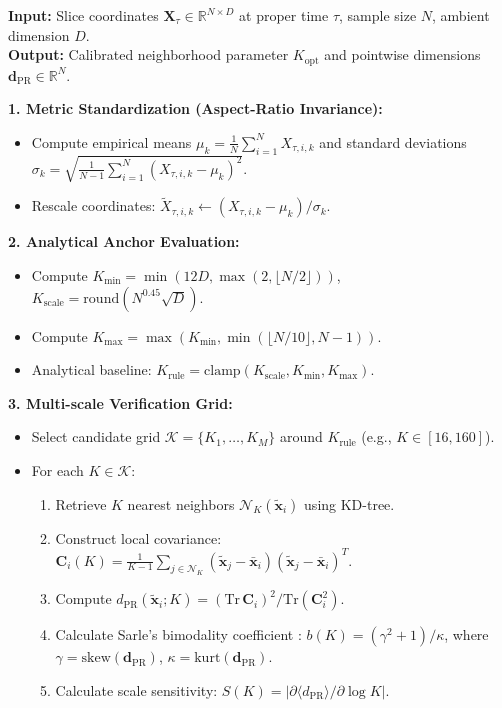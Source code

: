 \documentclass[11pt,a4paper]{article}
\begin{document}
\begin{tcolorbox}[colback=gray!5!white,colframe=blue!75!black,title=\textbf{Algorithm 1: Adaptive Neighborhood Calibration and Local PR Dimension Estimation},fonttitle=\bfseries]
\textbf{Input:} Slice coordinates $\mathbf{X}_\tau \in \mathbb{R}^{N \times D}$ at proper time $\tau$, sample size $N$, ambient dimension $D$.\\
\textbf{Output:} Calibrated neighborhood parameter $K_{\mathrm{opt}}$ and pointwise dimensions $\mathbf{d}_{\mathrm{PR}} \in \mathbb{R}^N$.

\vspace{0.5em}
\textbf{1. Metric Standardization (Aspect-Ratio Invariance):}
\begin{itemize}
    \item Compute empirical means $\mu_k = \frac{1}{N}\sum_{i=1}^N X_{\tau, i, k}$ and standard deviations $\sigma_k = \sqrt{\frac{1}{N-1}\sum_{i=1}^N (X_{\tau, i, k} - \mu_k)^2}$.
    \item Rescale coordinates: $\tilde{X}_{\tau, i, k} \gets (X_{\tau, i, k} - \mu_k) / \sigma_k$.
\end{itemize}

\textbf{2. Analytical Anchor Evaluation:}
\begin{itemize}
    \item Compute $K_{\min} = \min(12D, \max(2, \lfloor N/2 \rfloor))$, \quad $K_{\mathrm{scale}} = \mathrm{round}(N^{0.45}\sqrt{D})$.
    \item Compute $K_{\max} = \max(K_{\min}, \min(\lfloor N/10 \rfloor, N-1))$.
    \item Analytical baseline: $K_{\mathrm{rule}} = \mathrm{clamp}(K_{\mathrm{scale}}, K_{\min}, K_{\max})$.
\end{itemize}

\textbf{3. Multi-scale Verification Grid:}
\begin{itemize}
    \item Select candidate grid $\mathcal{K} = \{K_1, \dots, K_M\}$ around $K_{\mathrm{rule}}$ (e.g., $K \in [16, 160]$).
    \item For each $K \in \mathcal{K}$:
    \begin{enumerate}
        \item Retrieve $K$ nearest neighbors $\mathcal{N}_K(\tilde{\mathbf{x}}_i)$ using KD-tree.
        \item Construct local covariance: $\mathbf{C}_i(K) = \frac{1}{K-1}\sum_{j \in \mathcal{N}_K} (\tilde{\mathbf{x}}_j - \bar{\mathbf{x}}_i)(\tilde{\mathbf{x}}_j - \bar{\mathbf{x}}_i)^T$.
        \item Compute $d_{\mathrm{PR}}(\tilde{\mathbf{x}}_i; K) = (\mathrm{Tr}\,\mathbf{C}_i)^2 / \mathrm{Tr}(\mathbf{C}_i^2)$.
        \item Calculate Sarle's bimodality coefficient \cite{Sarle1983}: $b(K) = (\gamma^2 + 1)/\kappa$, where $\gamma = \mathrm{skew}(\mathbf{d}_{\mathrm{PR}})$, $\kappa = \mathrm{kurt}(\mathbf{d}_{\mathrm{PR}})$.
        \item Calculate scale sensitivity: $S(K) = |\partial \langle d_{\mathrm{PR}} \rangle / \partial \log K|$.
    \end{enumerate}
\end{itemize}


\end{tcolorbox}
\end{document}
